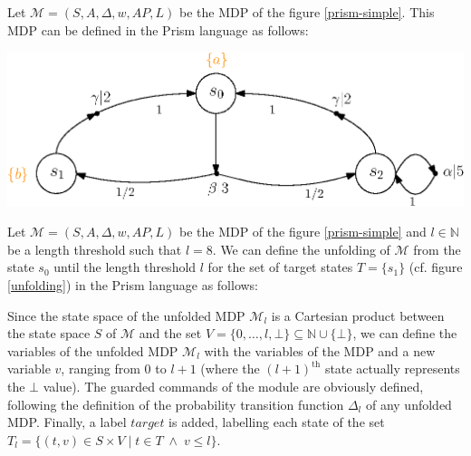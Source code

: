 \begin{example}
Let $\mathcal{M}=(S, A, \Delta, w, AP, L)$ be the MDP of the figure \ref{prism-simple}. This MDP can be defined in the Prism language as follows:\\
\begin{minipage}{0.4\linewidth}
  
\end{minipage}
\begin{minipage}{0.6\linewidth}
    \includegraphics[width=\linewidth]{resources/simple-mdp}
    \captionsetup{justification=centering}
    \label{prism-simple}
\end{minipage}
\end{example}

\begin{example}
Let $\mathcal{M}=(S, A, \Delta, w, AP, L)$ be the MDP of the figure \ref{prism-simple} and $l \in \mathbb{N}$
be a length threshold such that $l=8$. We can define the unfolding of $\mathcal{M}$ from the state $s_0$ until the length threshold $l$ for the set of target states $T = \{s_1\}$ (cf. figure \ref{unfolding}) in the Prism language as follows:

\end{example}
Since the state space of the unfolded MDP $\mathcal{M}_l$ is a Cartesian product between the state space $S$ of $\mathcal{M}$ and the set $V = \{0, \dots, l, \bot\} \subseteq \mathbb{N} \cup \{\bot\}$, we can define the variables of the unfolded MDP $\mathcal{M}_l$ with the variables of the MDP and a new variable $v$, ranging from $0$ to $l+1$ (where the $(l+1)^\text{th}$ state actually represents the $\bot$ value). The guarded
commands of the module are obviously defined, following the definition of the
probability transition function $\Delta_l$ of any unfolded MDP. Finally, a label $target$ is added,
labelling each state of the set $T_l = \{ (t, v) \in S \times V \; | \; t \in T \; \wedge \; v \leq l \}$.

